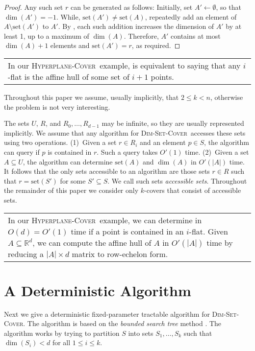 \documentclass[ccfonts,lotsofwhite]{patmorin}
\newcommand{\hppc}{\textsc{Hyperplane-Cover}}
\newcommand{\set}{\mathrm{set}}
\newcommand{\setcover}{\textsc{Dim-Set-Cover}}
\newenvironment{example}{%
	\addtolength{\textwidth}{-1cm}
	\begin{center}\begin{tabular}{|p{\textwidth}|}}
	{\end{tabular}\end{center}}
\begin{document}
\begin{proof}
Any such set $r$ can be generated as follows: Initially, set
$A'\gets\emptyset$, so that $\dim(A')=-1$.  While,
$\set(A')\neq\set(A)$, repeatedly add an element of
$A\setminus\set(A')$ to $A'$.  By , each
such addition increases the dimension of $A'$ by at least 1, up to a
maximum of $\dim(A)$.  Therefore, $A'$ contains at most $\dim(A)+1$
elements and $\set(A')=r$, as required.
\end{proof}

\begin{example}
In our \hppc\ example, \lemref{basis} is equivalent to saying that any
$i$-flat is the affine hull of some set of $i+1$ points.
\end{example}

Throughout this paper we assume, usually implicitly, that $2\le k< n$,
otherwise the problem is not very interesting.

The sets $U$, $R$, and $R_0,\ldots,R_{d-1}$ may be infinite, so they
are usually represented implicitly.  We assume that any algorithm for
\setcover\ accesses these sets using two operations.  (1)~Given a set
$r\in R_i$ and an element $p\in S$, the algorithm can query if $p$ is
contained in $r$.  Such a query takes $O'(1)$ time.  (2)~Given a set
$A\subseteq U$, the algorithm can determine $\set(A)$ and $\dim(A)$ in
$O'(|A|)$ time.  It follows that the only sets accessible to an
algorithm are those sets $r\in R$ such that $r=\set(S')$ for some
$S'\subseteq S$.  We call such sets \emph{accessible sets}.
Throughout the remainder of this paper we consider only $k$-covers
that consist of accessible sets.

\begin{example}
In our \hppc\ example, we can determine in $O(d)=O'(1)$ time if a point is
contained in an $i$-flat.  Given $A\subseteq\mathbb{R}^d$, we can
compute the affine hull of $A$ in $O'(|A|)$ time by reducing a
$|A|\times d$ matrix to row-echelon form.
\end{example}

\section{A Deterministic Algorithm}

Next we give a deterministic fixed-parameter tractable algorithm for
\setcover.  The algorithm is based on the \emph{bounded search tree}
method \cite{df99}.  The algorithm works by trying to partition $S$
into sets $S_1,\ldots,S_k$ such that $\dim(S_i)<d$ for all $1\le i\le
k$.
\end{document}
